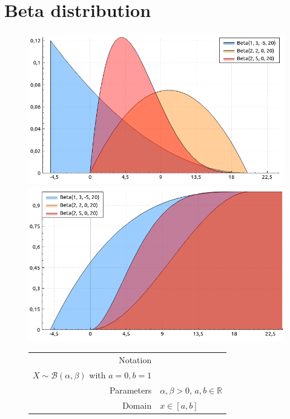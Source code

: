 \documentclass[a4paper,11pt]{article}
\theoremstyle{plain}
\theoremstyle{definition}
\newcommand{\MR}{\mathbb{R}}
\begin{document}
	\section{Beta distribution}
		\begin{figure}[!htb]\centering
			\begin{minipage}{0.55\textwidth}
				\includegraphics[width=\linewidth, right]{beta_pdf}
				\captionsetup{labelformat=empty}
				\includegraphics[width=\linewidth, right]{beta_cdf}
				\captionsetup{labelformat=empty}
			\end{minipage}
			\begin{minipage}{0.4\textwidth}
		\begin{tabular}{| r | l |}
			\hline
			Notation & \pbox{\linewidth}{$ X \sim \mathcal{B}(\alpha, \beta, a, b)$ \\ $X \sim \mathcal{B}(\alpha, \beta)$ with $a=0, b=1$} \\
			\hline
			Parameters & $\alpha, \beta > 0$, $a, b \in \MR$ \\
			\hline
			Domain & $x \in [a, b]$  \\

\end{tabular}
\end{minipage}
\end{figure}
\end{document}
